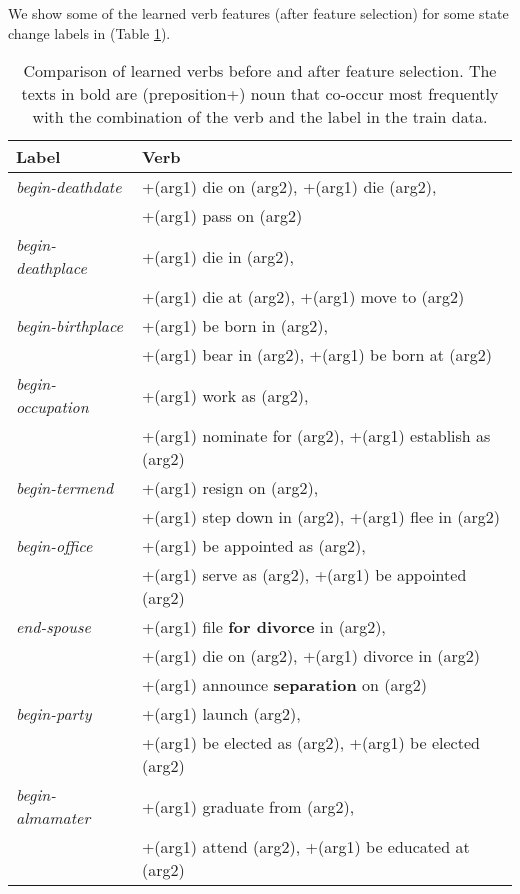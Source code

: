 We show some of the learned verb features (after feature selection) for some state change labels in (Table \ref{table:verbs}).
\begin{table}
\begin{scriptsize}
\begin{center}
\begin{tabular}{|l|l|}
\hline
Label & Verb \\
\hline
\textit{begin-deathdate} &+(arg1) die on (arg2), +(arg1) die (arg2), \\
& +(arg1) pass on (arg2) \\
\hline
\textit{begin-deathplace} &+(arg1) die in (arg2), \\
&+(arg1) die at (arg2), +(arg1) move to (arg2) \\
\hline
\textit{begin-birthplace} &+(arg1) be born in (arg2), \\
& +(arg1) bear in (arg2), +(arg1) be born at (arg2) \\
\hline
\textit{begin-occupation} &+(arg1) work as (arg2), \\
& +(arg1) nominate for (arg2), +(arg1) establish as (arg2) \\
\hline
\textit{begin-termend} &+(arg1) resign on (arg2), \\
& +(arg1) step down in (arg2), +(arg1) flee in (arg2) \\
\hline
\textit{begin-office} &+(arg1) be appointed as (arg2), \\
& +(arg1) serve as (arg2), +(arg1) be appointed (arg2) \\
\hline
\textit{end-spouse} &+(arg1) file \textbf{for divorce} in (arg2), \\
& +(arg1) die on (arg2), +(arg1) divorce in (arg2) \\
& +(arg1) announce \textbf{separation} on (arg2) \\
\hline
\textit{begin-party} &+(arg1) launch (arg2), \\
& +(arg1) be elected as (arg2), +(arg1) be elected (arg2) \\
\hline
\textit{begin-almamater} &+(arg1) graduate from (arg2), \\
& +(arg1) attend (arg2), +(arg1) be educated at (arg2) \\
\hline

\end{tabular}
\caption{\label{table:verbs} Comparison of learned verbs before and after feature selection. The texts in bold are (preposition+) noun that co-occur most frequently with the combination of the verb and the label in the train data.}
\end{center}
\end{scriptsize}
\end{table}
\normalsize
